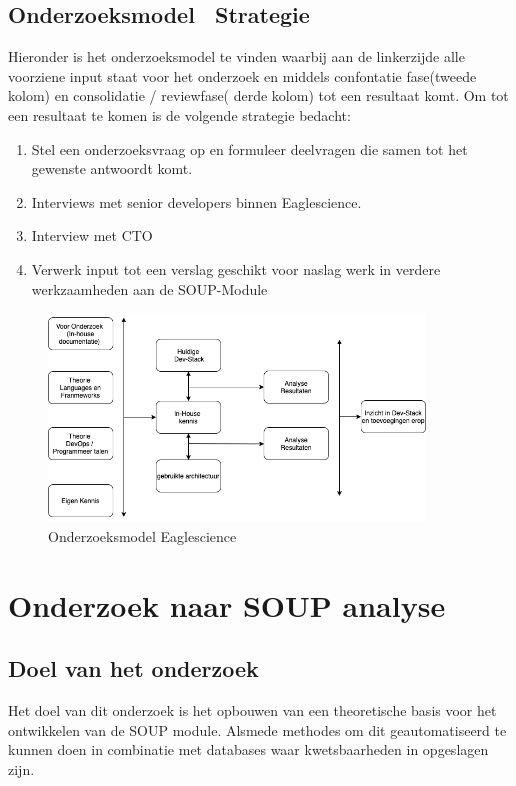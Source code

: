 \subsection{Onderzoeksmodel \ Strategie}\label{subsec:onderzoeksmodel--strategie}
Hieronder is het onderzoeksmodel te vinden waarbij aan de linkerzijde alle voorziene input staat voor het onderzoek en middels confontatie fase(tweede kolom) en consolidatie / reviewfase( derde kolom) tot een resultaat komt.
Om tot een resultaat te komen is de volgende strategie bedacht:
\begin{enumerate}
  \item Stel een onderzoeksvraag op en formuleer deelvragen die samen tot het gewenste antwoordt komt.
  \item Interviews met senior developers binnen Eaglescience.
  \item Interview met CTO
  \item Verwerk input tot een verslag geschikt voor naslag werk in verdere werkzaamheden aan de SOUP-Module
\end{enumerate}
\begin{figure}[h!]
\myfloatalign
\includegraphics[width=10cm]{gfx/OnderzoeksmodelES}
\caption{Onderzoeksmodel Eaglescience}
\label{fig:Onderzoeks model Eaglescience}
\end{figure}


\section{Onderzoek naar SOUP analyse}\label{sec:onderzoek-naar-soup-analyse}

\subsection{Doel van het onderzoek}\label{subsec:doel-van-het-onderzoek2}
Het doel van dit onderzoek is het opbouwen van een theoretische basis voor het ontwikkelen van de SOUP module.
Alsmede methodes om dit geautomatiseerd te kunnen doen in combinatie met databases waar kwetsbaarheden in opgeslagen zijn.



